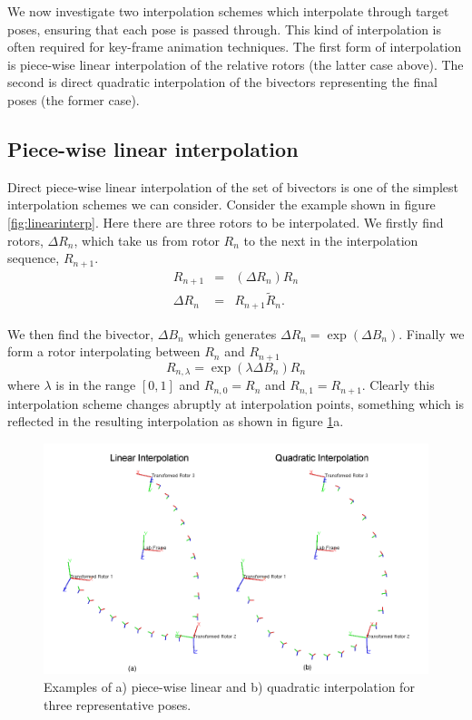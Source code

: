 We now investigate two interpolation schemes which interpolate through target
poses, ensuring that each pose is passed through. This kind of interpolation is
often required for key-frame animation techniques. The first form of
interpolation is piece-wise linear interpolation of the relative rotors (the
		latter case above). The second is direct quadratic
interpolation of the bivectors representing the final poses (the former case).


\subsection{Piece-wise linear interpolation}

Direct piece-wise linear interpolation of the set of bivectors is one of the simplest interpolation
schemes we can consider. Consider the example shown in figure \ref{fig:linearinterp}. Here there are
three rotors to be interpolated. We firstly find rotors, $\Delta R_n$, which take us from 
rotor $R_n$ to the next in the interpolation sequence, $R_{n+1}$.
\begin{eqnarray*}
R_{n+1} & = & (\Delta R_n) R_n\\
\Delta R_n & = & R_{n+1} \tilde{R}_n.
\end{eqnarray*}

We then find the bivector, $\Delta B_n$ which generates $\Delta R_n = \exp(\Delta B_n)$. Finally we
form a rotor interpolating between $R_n$  and $R_{n+1}$
\[
R_{n,\lambda} = \exp(\lambda \Delta B_n)R_n
\]
where $\lambda$ is in the range $[0,1]$ and $R_{n,0} = R_n$ and $R_{n,1} = R_{n+1}$.
Clearly this interpolation scheme changes abruptly at interpolation points, something which is
reflected in the resulting interpolation as shown in figure \ref{fig:interp}a.

\begin{figure}\centering
\includegraphics[width=\columnwidth]{interp}
\caption{\label{fig:interp}Examples of a) piece-wise linear and b) quadratic interpolation for
three representative poses.}
\end{figure}

